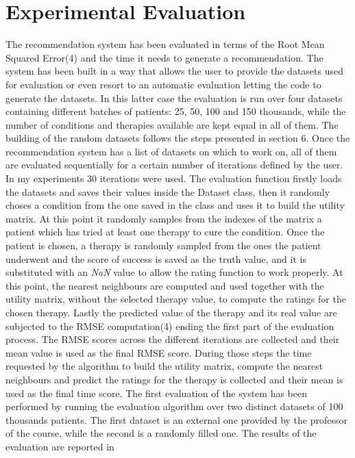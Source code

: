 \section{Experimental Evaluation}
The recommendation system has been evaluated in terms of the Root Mean Squared
Error(4) and the time it needs to generate a recommendation.
The system has been built in a way that allows the user to provide the datasets
used for evaluation or even resort to an automatic evaluation
letting the code to generate the datasets. In this latter case the
evaluation is run over four datasets containing different batches of patients:
25, 50, 100 and 150 thousands, while the number of conditions and therapies
available are kept equal in all of them.
The building of the random datasets follows the steps presented in section 6.
Once the recommendation system has a list of datasets on which to work on,
all of them are evaluated sequentially for a certain number of iterations
defined by the user. In my experiments 30 iterations were used.
The evaluation function firstly loads the datasets and saves their values
inside the Dataset class, then
it randomly choses a condition from the one saved in the class and uses it to
build the utility matrix. At this point it randomly samples from the indexes
of the matrix a patient which has tried at least one therapy to cure
the condition. Once the patient is chosen, a therapy is randomly sampled
from the ones the patient underwent and the score of success is saved as the
truth value,
and it is substituted with an \emph{NaN} value to allow the rating function to
work properly. At this point, the nearest neighbours are computed and used
together with the utility matrix, without the selected therapy value, to 
compute the ratings for the chosen therapy. Lastly the predicted value of
the therapy and its real value are subjected to the RMSE computation(4)
ending the first part of the evaluation process.
The RMSE scores across the different iterations are collected and their mean
value is used as the final RMSE score.
During those steps the time requested by the algorithm to build the utility
matrix, compute the nearest neighbours and predict the ratings for the therapy
is collected and their mean is used as the final time score.
The first evaluation of the system has been performed by running the evaluation
algorithm over two distinct datasets of 100 thousands patients. The first 
dataset is an external one provided by the professor of the course, while the
second is a randomly filled one. The results of the evaluation are reported in
